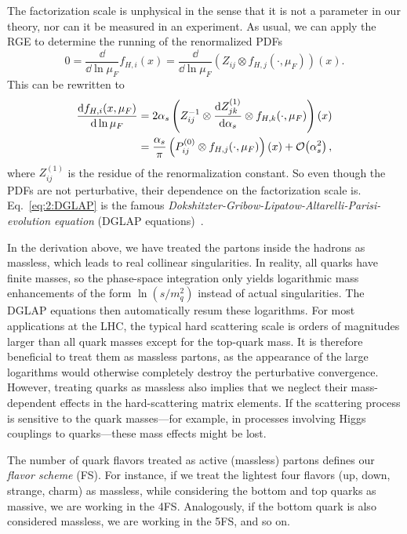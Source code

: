 The factorization scale is unphysical in the sense that it is not a parameter in our theory, nor can it be measured in an experiment. As usual, we can apply the \acs{RGE} to determine the running of the renormalized \acs{PDF}s
\begin{equation}
0 = \frac{\dd}{\dd \ln \mu_F} f_{H,i}(x) = \frac{\dd}{\dd \ln \mu_F} (Z_{ij} \otimes f_{H, j}(\cdot, \mu_F))(x).
\end{equation}
This can be rewritten to
\begin{equation}
\begin{split}
\frac{\mathrm{d} f_{H,i}(x, \mu_F)}{\mathrm{d} \ln \mu_F} &=  2 \alpha_s \left(Z_{ij}^{-1} \otimes \frac{\mathrm{d} Z_{jk}^{(1)}}{\mathrm{d} \alpha_s} \otimes f_{H,k}(\cdot, \mu_F) \right)(x) \\
&= \frac{\alpha_s}{\pi} \left(P_{ij}^{(0)} \otimes f_{H,j}(\cdot, \mu_F) \right)(x) + \mathcal{O}\!\left(\alpha_s^2\right),
\label{eq:2:DGLAP}
\end{split}
\end{equation}
where $Z^{(1)}_{ij}$ is the residue of the renormalization constant. So even though the \acs{PDF}s are not perturbative, their dependence on the factorization scale is. Eq.~\eqref{eq:2:DGLAP} is the famous \textit{Dokshitzter-Gribow-Lipatow-Altarelli-Parisi-evolution equation} (DGLAP equations)~\cite{Dokshitzer:1977sg,Gribov:1972ri,Altarelli:1977zs}.

In the derivation above, we have treated the partons inside the hadrons as massless, which leads to real collinear singularities. In reality, all quarks have finite masses, so the phase-space integration only yields logarithmic mass enhancements of the form $\ln (s/m_q^2)$ instead of actual singularities. The DGLAP equations then automatically resum these logarithms. For most applications at the \acs{LHC}, the typical hard scattering scale is orders of magnitudes larger than all quark masses except for the top-quark mass. It is therefore beneficial to treat them as massless partons, as the appearance of the large logarithms would otherwise completely destroy the perturbative convergence. However, treating quarks as massless also implies that we neglect their mass-dependent effects in the hard-scattering matrix elements. If the scattering process is sensitive to the quark masses---for example, in processes involving Higgs couplings to quarks---these mass effects might be lost.

The number of quark flavors treated as active (massless) partons defines our \textit{flavor scheme} (\acs{FS}). For instance, if we treat the lightest four flavors (up, down, strange, charm) as massless, while considering the bottom and top quarks as massive, we are working in the 4\acs{FS}. Analogously, if the bottom quark is also considered massless, we are working in the 5\acs{FS}, and so on.

